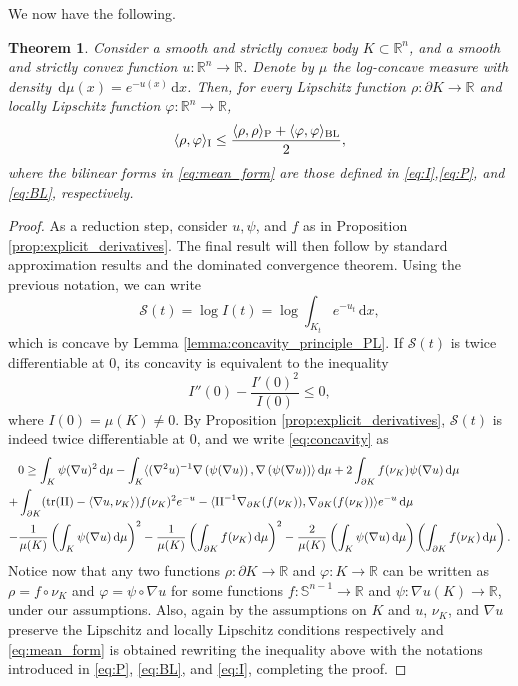 \documentclass[a4paper, 11pt]{article}
\newcommand{\R}{\mathbb{R}}
\newcommand{\sph}{\mathbb{S}}
\newcommand{\tra}{\mathrm{tr}}
\newtheorem{theorem}{Theorem}[section]
\theoremstyle{definition}
\newcommand{\di}{\, \mathrm{d}}
\newcommand{\F}{\mathcal{S}}
\begin{document}
We now have the following.
\begin{theorem}\label{thm:mean_form}
    Consider a smooth and strictly convex body $K \subset \R^n$, and a smooth and strictly convex function $u: \R^n \to \R$. Denote by $\mu$ the log-concave measure with density $\di \mu(x)=e^{-u(x)}\di x$. Then, for every Lipschitz function $\rho : \partial K \to \R$ and locally Lipschitz function $\varphi: \R^n \to \R$, 
    \begin{equation}\label{eq:mean_form}
        \langle \rho, \varphi\rangle_{\rm I} \leq \frac{\langle \rho, \rho \rangle_{\rm P}+\langle \varphi, \varphi \rangle_{\rm BL}}{2},
    \end{equation}
    where the bilinear forms in \eqref{eq:mean_form} are those defined in \eqref{eq:I},\eqref{eq:P}, and \eqref{eq:BL}, respectively.
\end{theorem}
\begin{proof}
     As a reduction step, consider $u,\psi$, and $f$ as in Proposition \ref{prop:explicit_derivatives}. The final result will then follow by standard approximation results and the dominated convergence theorem. Using the previous notation, we can write \[\F(t)=\log I(t)=\log \int_{K_t}e^{-u_t} \di x,\] which is concave by Lemma \ref{lemma:concavity_principle_PL}. If $\F(t)$ is twice differentiable at $0$, its concavity is equivalent to the inequality
     \begin{equation}\label{eq:concavity}
         I''(0)-\frac{I'(0)^2}{I(0)} \leq 0,
     \end{equation}
     where $I(0)=\mu(K)\neq 0$. By Proposition \ref{prop:explicit_derivatives}, $\F(t)$ is indeed twice differentiable at $0$, and we write \eqref{eq:concavity} as 
     \begin{align*}
         & 0 \geq \int_K \psi(\nabla u)^2\di \mu  -\int_K \langle(\nabla^2 u)^{-1}\nabla \left(\psi(\nabla u)\right),\nabla \left(\psi(\nabla u)\right) \rangle \di\mu + 2\int_{\partial K} f(\nu_K)\psi(\nabla u)\di \mu \\ + &
        \int_{\partial K}(\tra({\rm II})-\langle \nabla u, \nu_K \rangle)f(\nu_K)^2 e^{-u}-\langle {\rm II}^{-1}\nabla_{\partial K} (f(\nu_K)),\nabla_{\partial K} (f(\nu_K))\rangle e^{-u}\di \mu\\
        -& \frac{1}{\mu(K)}\left(\int_K \psi(\nabla u) \di \mu \right)^2 - \frac{1}{\mu(K)}\left(\int_{\partial K} f(\nu_K) \di \mu \right)^2 -\frac{2}{\mu(K)}\left(\int_K \psi(\nabla u) \di \mu \right)\left(\int_{\partial K} f(\nu_K) \di \mu \right).
     \end{align*}
     Notice now that any two functions $\rho : \partial K \rightarrow \mathbb{R}$ and $\varphi: K \rightarrow \mathbb{R}$ can be written as $\rho=f \circ \nu_K$ and $\varphi=\psi \circ \nabla u$ for some functions $f:\sph^{n-1}\rightarrow \mathbb{R}$ and $\psi: \nabla u(K) \rightarrow \mathbb{R}$, under our assumptions. Also, again by the assumptions on $K$ and $u$, $\nu_K$, and $\nabla u$ preserve the Lipschitz and locally Lipschitz conditions respectively and \eqref{eq:mean_form} is obtained rewriting the inequality above with the notations introduced in \eqref{eq:P}, \eqref{eq:BL}, and \eqref{eq:I}, completing the proof.
\end{proof}
\end{document}

